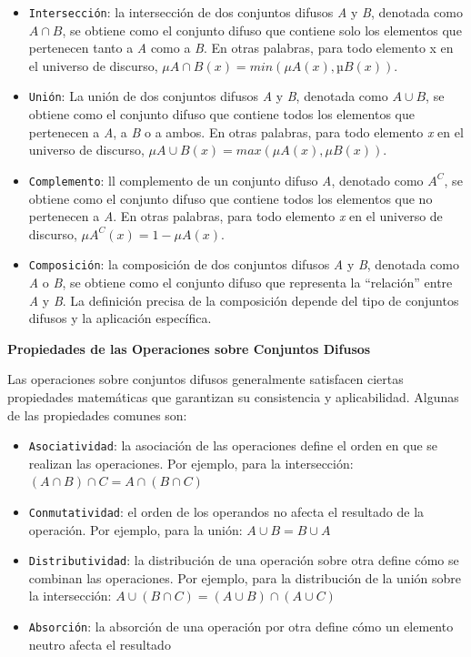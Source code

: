 \documentclass[
  a4paper,
  DIV=11,
  numbers=noendperiod]{scrreprt}
\begin{document}
\begin{itemize}
  \begin{itemize}
  \item
    \texttt{Intersección}: la intersección de dos conjuntos difusos
    \emph{A} y \emph{B}, denotada como \(A ∩ B\), se obtiene como el
    conjunto difuso que contiene solo los elementos que pertenecen tanto
    a \emph{A} como a \emph{B}. En otras palabras, para todo elemento x
    en el universo de discurso, \(\mu A∩B(x) = min(\mu A(x), µB(x))\).
  \item
    \texttt{Unión}: La unión de dos conjuntos difusos \emph{A} y
    \emph{B}, denotada como \(A ∪ B\), se obtiene como el conjunto
    difuso que contiene todos los elementos que pertenecen a \emph{A}, a
    \emph{B} o a ambos. En otras palabras, para todo elemento \emph{x}
    en el universo de discurso,
    \(\mu A∪B(x) = max(\mu A(x), \mu B(x))\).
  \item
    \texttt{Complemento}: ll complemento de un conjunto difuso \emph{A},
    denotado como \(A^C\), se obtiene como el conjunto difuso que
    contiene todos los elementos que no pertenecen a \emph{A}. En otras
    palabras, para todo elemento \emph{x} en el universo de discurso,
    \(\mu A^C(x) = 1 - \mu A(x)\).
  \item
    \texttt{Composición}: la composición de dos conjuntos difusos
    \emph{A} y \emph{B}, denotada como \emph{A} o \emph{B}, se obtiene
    como el conjunto difuso que representa la ``relación'' entre
    \emph{A} y \emph{B}. La definición precisa de la composición depende
    del tipo de conjuntos difusos y la aplicación específica.
  \end{itemize}
\end{itemize}

\textbf{Propiedades de las Operaciones sobre Conjuntos Difusos}

Las operaciones sobre conjuntos difusos generalmente satisfacen ciertas
propiedades matemáticas que garantizan su consistencia y aplicabilidad.
Algunas de las propiedades comunes son:

\begin{itemize}
\item
  \texttt{Asociatividad}: la asociación de las operaciones define el
  orden en que se realizan las operaciones. Por ejemplo, para la
  intersección: \((A ∩ B) ∩ C = A ∩ (B ∩ C)\)
\item
  \texttt{Conmutatividad}: el orden de los operandos no afecta el
  resultado de la operación. Por ejemplo, para la unión:
  \(A ∪ B = B ∪ A\)
\item
  \texttt{Distributividad}: la distribución de una operación sobre otra
  define cómo se combinan las operaciones. Por ejemplo, para la
  distribución de la unión sobre la intersección:
  \(A ∪ (B ∩ C) = (A ∪ B) ∩ (A ∪ C)\)
\item
  \texttt{Absorción}: la absorción de una operación por otra define cómo
  un elemento neutro afecta el resultado
\end{itemize}
\end{document}
